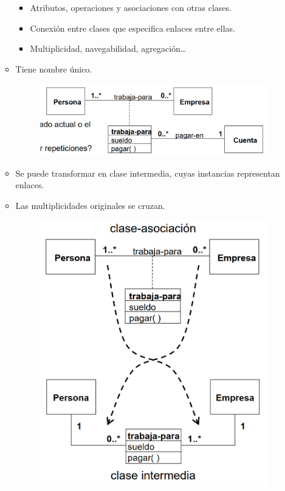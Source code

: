\documentclass[12pt, twoside, openright]{report} %
\begin{document}
\begin{itemize}
\begin{itemize}
\begin{itemize}
        \item
          Atributos, operaciones y asociaciones con otras clases.
        \item
          Conexión entre clases que especifica enlaces entre ellas.
        \item
          Multiplicidad, navegabilidad, agregación\ldots{}
        \end{itemize}
      \item
        Tiene nombre único.
		\begin{figure}[H]
			{\includegraphics[scale=.25]{Untitled 23.png}}
		\end{figure}
      \item
        Se puede transformar en clase intermedia, cuyas instancias
        representan enlaces.
      \item
        Las multiplicidades originales se cruzan.
		\begin{figure}[H]
			{\includegraphics[scale=.25]{Untitled 24.png}}
		\end{figure}
      \end{itemize}
    \end{itemize}
\end{document}
